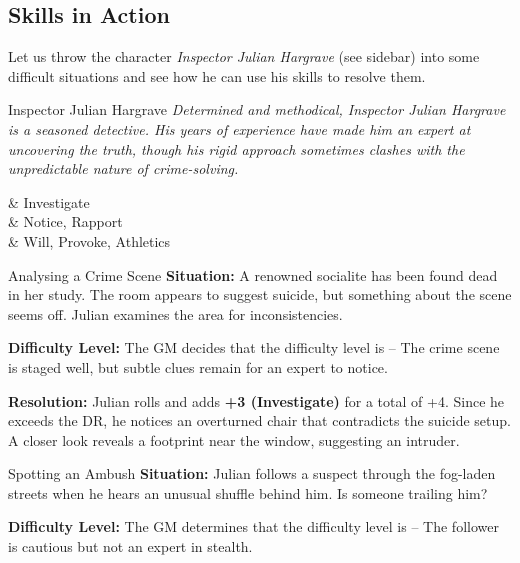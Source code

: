	\begin{multicols}{2}
	\subsection{Skills in Action}

	Let us throw the character \emph{Inspector Julian Hargrave} (see sidebar) into some difficult situations and see how he can use his skills to resolve them.

	\begin{NPC}{Inspector Julian Hargrave}
		\emph{Determined and methodical, Inspector Julian Hargrave is a seasoned detective. His years of experience have made him an expert at uncovering the truth, though his rigid approach sometimes clashes with the unpredictable nature of crime-solving.}

		\vspace{0.5\baselineskip}
		\begin{SkillsBox}
			\Expert & Investigate \\
			\Skilled & Notice, Rapport \\
			\Novice & Will, Provoke, Athletics \\
		\end{SkillsBox}
	\end{NPC}

	\begin{Example}{Analysing a Crime Scene}
		\textbf{Situation:} A renowned socialite has been found dead in her study. The room appears to suggest suicide, but something about the scene seems off. Julian examines the area for inconsistencies.

		\noindent
		\textbf{Difficulty Level:} The GM decides that the difficulty level is \Formidable – The crime scene is staged well, but subtle clues remain for an expert to notice.

		\raggedright\noindent
		\textbf{Resolution:} Julian rolls  and adds \textbf{+3 (Investigate)} for a total of +4. Since he exceeds the DR, he notices an overturned chair that contradicts the suicide setup. A closer look reveals a footprint near the window, suggesting an intruder.
	\end{Example}


	\begin{Example}{Spotting an Ambush}
		\textbf{Situation:} Julian follows a suspect through the fog-laden streets when he hears an unusual shuffle behind him. Is someone trailing him?

		\noindent\textbf{Difficulty Level:} The GM determines that the difficulty level is \Difficult – The follower is cautious but not an expert in stealth.


\end{Example}
\end{multicols}
